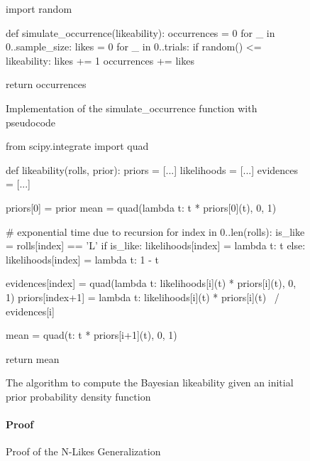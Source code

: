 \documentclass[a4paper,11pt]{article}
\begin{document}
\begin{figure}[H]
    \begin{pythonln}
import random

def simulate_occurrence(likeability):
    occurrences = 0
    for _ in 0..sample_size:
        likes = 0
        for _ in 0..trials:
            if random() <= likeability:
                likes += 1
            occurrences += likes

    return occurrences
    \end{pythonln}
    \caption{Implementation of the simulate\_occurrence function with pseudocode}
    \label{apd:sim_occ}
\end{figure}

\begin{figure}[H]
    \begin{pythonln}
from scipy.integrate import quad

def likeability(rolls, prior):
    priors = [...]
    likelihoods = [...]
    evidences = [...]

    priors[0] = prior
    mean = quad(lambda t: t * priors[0](t), 0, 1)

    # exponential time due to recursion
    for index in 0..len(rolls):
        is_like = rolls[index] == 'L'
        if is_like:
            likelihoods[index] = lambda t: t
        else:
            likelihoods[index] = lambda t: 1 - t

        evidences[index] = quad(lambda t: likelihoods[i](t) * priors[i](t),
                               0, 1)
        priors[index+1] = lambda t: likelihoods[i](t) * priors[i](t) \
                                / evidences[i]

        mean = quad(t: t * priors[i+1](t), 0, 1)

    return mean
    \end{pythonln}
    \caption{The algorithm to compute the Bayesian likeability given an initial prior probability density function}
    \label{apd:algo}
\end{figure}

\begin{figure}[H]
    \paragraph{Proof}

    \caption{Proof of the N-Likes Generalization}
    \label{eq:nlikeproof}
\end{figure}
\end{document}
